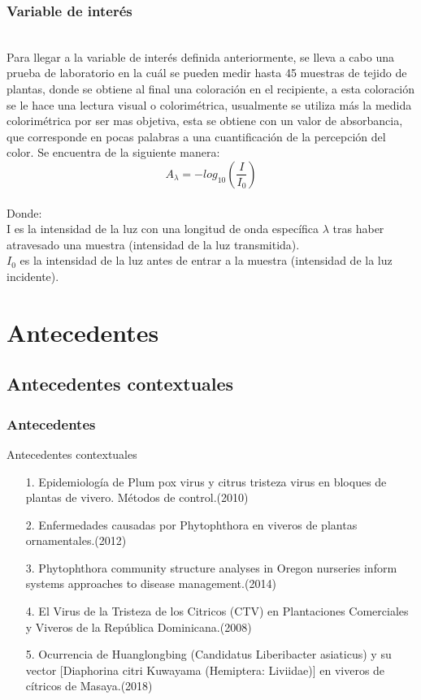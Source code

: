 \documentclass[10pt]{beamer}
\begin{document}
\begin{frame}
\frametitle{Variable de interés}
~\\Para llegar a la variable de interés definida anteriormente, se lleva a cabo una prueba de laboratorio en la cuál se pueden medir hasta 45 muestras de tejido de plantas, donde se obtiene al final una coloración en el recipiente, a esta coloración se le hace una lectura visual o colorimétrica, usualmente se utiliza más la medida colorimétrica por ser mas objetiva, esta se obtiene con un valor de absorbancia, que corresponde en pocas palabras a una cuantificación de la percepción del color. Se encuentra de la siguiente manera:
\[ A_\lambda=-log_{10} \left( \frac{I}{I_0}\right) \]
~\\Donde:
~\\I es la intensidad de la luz con una longitud de onda específica $\lambda$ tras haber atravesado una muestra (intensidad de la luz transmitida).
~\\$I_0$  es la intensidad de la luz antes de entrar a la muestra (intensidad de la luz incidente).
\end{frame}

\section{Antecedentes}
\subsection{Antecedentes contextuales}
\begin{frame}
\frametitle{Antecedentes}
\begin{block}{Antecedentes contextuales}
\begin{itemize}
\justifying
\item[1.]Epidemiología de Plum pox virus y citrus tristeza virus en bloques de plantas de vivero. Métodos de control.(2010)\cite{AC1}
\item[2.]Enfermedades causadas por Phytophthora en viveros de plantas ornamentales.(2012)\cite{AC2}
\item[3.]Phytophthora community structure analyses in Oregon nurseries inform systems approaches to disease management.(2014)\cite{AC3}
\item[4.]El Virus de la Tristeza de los Citricos (CTV) en Plantaciones Comerciales y Viveros de la República Dominicana.(2008)\cite{AC4}
\item[5.]Ocurrencia de Huanglongbing (Candidatus Liberibacter asiaticus) y su vector [Diaphorina citri Kuwayama (Hemiptera: Liviidae)] en viveros de cítricos de Masaya.(2018)\cite{AC5}
\end{itemize}
\end{block}
\end{frame}
\end{document}
